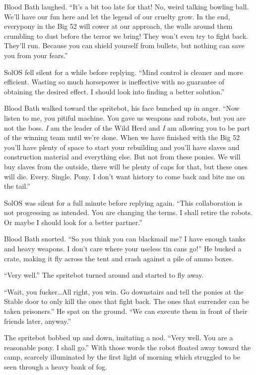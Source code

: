 Blood Bath laughed. ``It's a bit too late for that! No, weird talking bowling ball. We'll have our fun here and let the legend of our cruelty grow. In the end, everypony in the Big 52 will cower at our approach, the walls around them crumbling to dust before the terror we bring! They won't even try to fight back. They'll run. Because you can shield yourself from bullets, but nothing can save you from your fears.''

SolOS fell silent for a while before replying. ``Mind control is cleaner and more efficient. Wasting so much horsepower is ineffective with no guarantee of obtaining the desired effect. I should look into finding a better solution.''

Blood Bath walked toward the spritebot, his face bunched up in anger. ``Now listen to me, you pitiful machine. You gave us weapons and robots, but you are not the boss. \emph{I} am the leader of the Wild Herd and \emph{I} am allowing you to be part of the winning team until we're done. When we have finished with the Big 52 you'll have plenty of space to start your rebuilding and you'll have slaves and construction material and everything else. But not from these ponies. We will buy slaves from the outside, there will be plenty of caps for that, but these ones will die. Every. Single. Pony. I don't want history to come back and bite me on the tail.''

SolOS was silent for a full minute before replying again. ``This collaboration is not progressing as intended. You are changing the terms. I shall retire the robots. Or maybe I should look for a better partner.''

Blood Bath snorted. ``So you think you can blackmail me? I have enough tanks and heavy weapons. I don't care where your useless tin cans go!'' He bucked a crate, making it fly across the tent and crash against a pile of ammo boxes.

``Very well.'' The spritebot turned around and started to fly away.

``Wait, you fucker\dots All right, you win. Go downstairs and tell the ponies at the Stable door to only kill the ones that fight back. The ones that surrender can be taken prisoners.'' He spat on the ground. ``We can execute them in front of their friends later, anyway.''

The spritebot bobbed up and down, imitating a nod. ``Very well. You are a reasonable pony. I shall go.'' With those words the robot floated away toward the camp, scarcely illuminated by the first light of morning which struggled to be seen through a heavy bank of fog.

